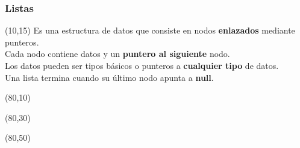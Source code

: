 \documentclass[aspectratio=169]{beamer}
\begin{document}

\begin{frame}[t]
    \frametitle{Listas}
    \begin{textblock}{60}(10,15)
    Es una estructura de datos que consiste en nodos \textbf{enlazados} mediante punteros.\\
    \bigskip
    Cada nodo contiene datos y un \textbf{puntero al siguiente} nodo.\\
    \bigskip
    Los datos pueden ser tipos básicos o punteros a \textbf{cualquier tipo} de datos.\\
    \bigskip
    Una lista termina cuando su último nodo apunta a \textbf{null}.\\
    \end{textblock}
    \begin{textblock}{60}(80,10)  \end{textblock}
    \begin{textblock}{60}(80,30)  \end{textblock}
    \begin{textblock}{60}(80,50)  \end{textblock}
\end{frame}
\end{document}
